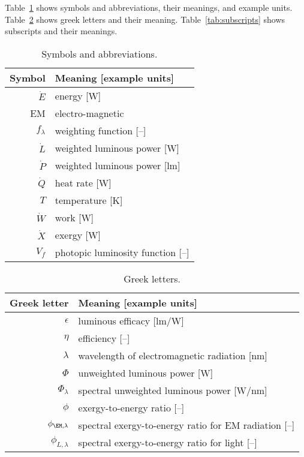 
\noindent 
Table~\ref{tab:symbols} shows symbols and abbreviations, their meanings, and example units.
Table~\ref{tab:greek} shows greek letters and their meaning.
Table~\ref{tab:subscripts} shows subscripts and their meanings.


  
\begin{table}
\centering %
\caption{Symbols and abbreviations.}
\begin{tabular}{r l}
\toprule
Symbol & Meaning [example units] \\
\midrule
$\dot{E}$ & energy [W] \\
EM & electro-magnetic \\
$f_\lambda$ & weighting function [--] \\
$\dot{L}$ & weighted luminous power [W] \\
$\dot{P}$ & weighted luminous power [lm] \\
$\dot{Q}$ & heat rate [W] \\
$T$ & temperature [K] \\
$\dot{W}$ & work [W] \\
$\dot{X}$ & exergy [W] \\
$V_f$ & photopic luminosity function [--] \\
\bottomrule
\end{tabular}
\label{tab:symbols}
\end{table}



\begin{table}
\centering %
\caption{Greek letters.}
\begin{tabular}{r l}
  \toprule
  Greek letter & Meaning [example units] \\
  \midrule
  $\epsilon$ & luminous efficacy [lm/W] \\
  $\eta$ & efficiency [--] \\
  $\lambda$ & wavelength of electromagnetic radiation [nm] \\
  $\Phi$ & unweighted luminous power [W] \\
  $\Phi_\lambda$ & spectral unweighted luminous power [W/nm] \\
  $\phi$ & exergy-to-energy ratio [--] \\
  $\phi_{\EM,\lambda}$ & spectral exergy-to-energy ratio for EM radiation [--] \\
  $\phi_{L,\lambda}$ & spectral exergy-to-energy ratio for light [--] \\
  \bottomrule
\end{tabular}
\label{tab:greek}
\end{table}


